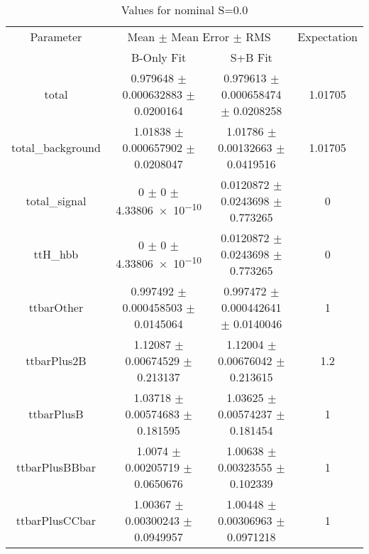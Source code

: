 \begin{table}
\centering
\caption{Values for nominal S=0.0}
\begin{tabular}{cccc}
\toprule
Parameter & \multicolumn{2}{c}{Mean $\pm$ Mean Error $\pm$ RMS} & Expectation\\
 & B-Only Fit & S+B Fit & \\
\midrule
total & \num{0.979648} $\pm$ \num{0.000632883} $\pm$ \num{0.0200164} & \num{0.979613} $\pm$ \num{0.000658474} $\pm$ \num{0.0208258} & \num{1.01705}\\
total\_background & \num{1.01838} $\pm$ \num{0.000657902} $\pm$ \num{0.0208047} & \num{1.01786} $\pm$ \num{0.00132663} $\pm$ \num{0.0419516} & \num{1.01705}\\
total\_signal & \num{0} $\pm$ \num{0} $\pm$ \num{4.33806e-10} & \num{0.0120872} $\pm$ \num{0.0243698} $\pm$ \num{0.773265} & \num{0}\\
ttH\_hbb & \num{0} $\pm$ \num{0} $\pm$ \num{4.33806e-10} & \num{0.0120872} $\pm$ \num{0.0243698} $\pm$ \num{0.773265} & \num{0}\\
ttbarOther & \num{0.997492} $\pm$ \num{0.000458503} $\pm$ \num{0.0145064} & \num{0.997472} $\pm$ \num{0.000442641} $\pm$ \num{0.0140046} & \num{1}\\
ttbarPlus2B & \num{1.12087} $\pm$ \num{0.00674529} $\pm$ \num{0.213137} & \num{1.12004} $\pm$ \num{0.00676042} $\pm$ \num{0.213615} & \num{1.2}\\
ttbarPlusB & \num{1.03718} $\pm$ \num{0.00574683} $\pm$ \num{0.181595} & \num{1.03625} $\pm$ \num{0.00574237} $\pm$ \num{0.181454} & \num{1}\\
ttbarPlusBBbar & \num{1.0074} $\pm$ \num{0.00205719} $\pm$ \num{0.0650676} & \num{1.00638} $\pm$ \num{0.00323555} $\pm$ \num{0.102339} & \num{1}\\
ttbarPlusCCbar & \num{1.00367} $\pm$ \num{0.00300243} $\pm$ \num{0.0949957} & \num{1.00448} $\pm$ \num{0.00306963} $\pm$ \num{0.0971218} & \num{1}\\
\bottomrule
\end{tabular}
\end{table}